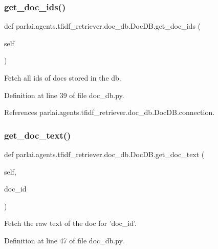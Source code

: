 \subsubsection{\texorpdfstring{get\+\_\+doc\+\_\+ids()}{get\_doc\_ids()}}
{\footnotesize\ttfamily def parlai.\+agents.\+tfidf\+\_\+retriever.\+doc\+\_\+db.\+Doc\+D\+B.\+get\+\_\+doc\+\_\+ids (\begin{DoxyParamCaption}\item[{}]{self }\end{DoxyParamCaption})}

\begin{DoxyVerb}Fetch all ids of docs stored in the db.\end{DoxyVerb}
 

Definition at line 39 of file doc\+\_\+db.\+py.



References parlai.\+agents.\+tfidf\+\_\+retriever.\+doc\+\_\+db.\+Doc\+D\+B.\+connection.

\mbox{\label{classparlai_1_1agents_1_1tfidf__retriever_1_1doc__db_1_1DocDB_a47aa0c10aa3f9693b2aa460953344d7e}} 
\subsubsection{\texorpdfstring{get\+\_\+doc\+\_\+text()}{get\_doc\_text()}}
{\footnotesize\ttfamily def parlai.\+agents.\+tfidf\+\_\+retriever.\+doc\+\_\+db.\+Doc\+D\+B.\+get\+\_\+doc\+\_\+text (\begin{DoxyParamCaption}\item[{}]{self,  }\item[{}]{doc\+\_\+id }\end{DoxyParamCaption})}

\begin{DoxyVerb}Fetch the raw text of the doc for 'doc_id'.\end{DoxyVerb}
 

Definition at line 47 of file doc\+\_\+db.\+py.




